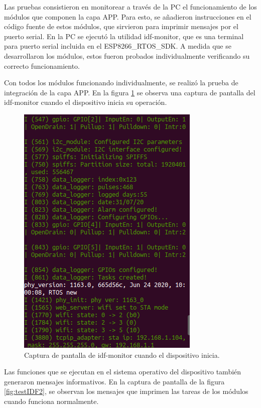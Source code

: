 Las pruebas consistieron en monitorear a través de la PC el funcionamiento de los módulos que componen la capa APP. Para esto, se añadieron instrucciones en el código fuente de estos módulos, que sirvieron para imprimir mensajes por el puerto serial. En la PC se ejecutó la utilidad idf-monitor, que es una terminal para puerto serial incluida en el ESP8266\_RTOS\_SDK. A medida que se desarrollaron los módulos, estos fueron probados individualmente verificando su correcto funcionamiento. 

Con todos los módulos funcionando individualmente, se realizó la prueba de integración de la capa APP. En la figura \ref{fig:testIDF1} se observa una captura de pantalla del idf-monitor cuando el dispositivo inicia su operación.

\begin{figure}[ht]
	\centering
	\includegraphics[scale=0.55]{./Figures/test_firmware_init.png}
	\caption{Captura de pantalla de idf-monitor cuando el dispositivo inicia.}
	\label{fig:testIDF1}
\end{figure}

Las funciones que se ejecutan en el sistema operativo del dispositivo también generaron mensajes informativos. En la captura de pantalla de la figura \ref{fig:testIDF2}, se observan los mensajes que imprimen las tareas de los módulos cuando funciona normalmente.

